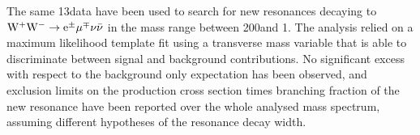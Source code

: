 The same 13\TeV data have been used to search for new resonances decaying to $\rm{W^+W^-}\to e^{\pm} \mu^{\mp}\nu\bar{\nu}$ in the mass range between 200\GeV and 1\TeV. The analysis relied on a maximum likelihood template fit using a transverse mass variable that is able to discriminate between signal and background contributions. No significant excess with respect to the background only expectation has been observed, and exclusion limits on the production cross section times branching fraction of the new resonance have been reported over the whole analysed mass spectrum, assuming different hypotheses of the resonance decay width.
